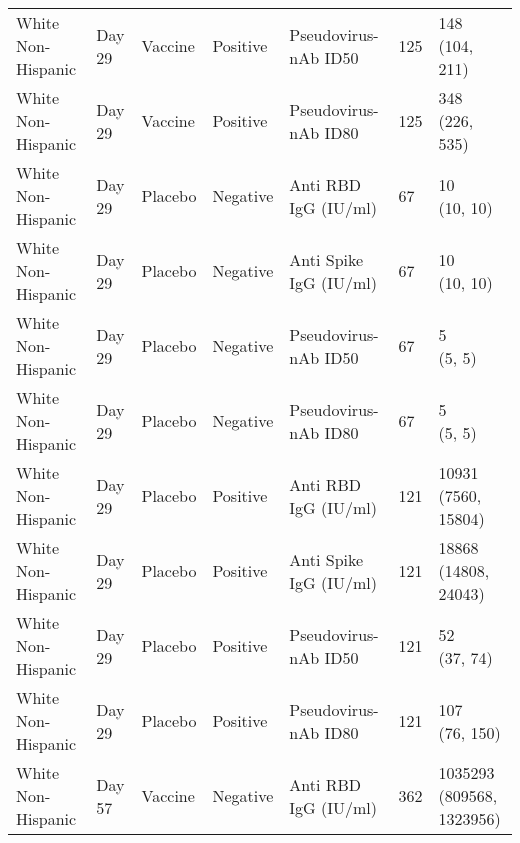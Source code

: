 \documentclass[]{book}
\theoremstyle{definition}
\theoremstyle{definition}
\theoremstyle{definition}
\newcommand{\1}{\mathbbm{1}}
\begin{document}
\begin{landscape}
\begin{ThreePartTable}
\begin{longtable}[t]{>{\raggedright\arraybackslash}p{7cm}llllll}
\hspace{1em}White Non-Hispanic & Day 29 & Vaccine & Positive & Pseudovirus-nAb ID50 & 125 & \makecell[l]{148\\(104, 211)}\\
\hspace{1em}White Non-Hispanic & Day 29 & Vaccine & Positive & Pseudovirus-nAb ID80 & 125 & \makecell[l]{348\\(226, 535)}\\
\hspace{1em}White Non-Hispanic & Day 29 & Placebo & Negative & Anti RBD IgG (IU/ml) & 67 & \makecell[l]{10\\(10, 10)}\\
\hspace{1em}White Non-Hispanic & Day 29 & Placebo & Negative & Anti Spike IgG (IU/ml) & 67 & \makecell[l]{10\\(10, 10)}\\
\hspace{1em}White Non-Hispanic & Day 29 & Placebo & Negative & Pseudovirus-nAb ID50 & 67 & \makecell[l]{5\\(5, 5)}\\
\hspace{1em}White Non-Hispanic & Day 29 & Placebo & Negative & Pseudovirus-nAb ID80 & 67 & \makecell[l]{5\\(5, 5)}\\
\hspace{1em}White Non-Hispanic & Day 29 & Placebo & Positive & Anti RBD IgG (IU/ml) & 121 & \makecell[l]{10931\\(7560, 15804)}\\
\hspace{1em}White Non-Hispanic & Day 29 & Placebo & Positive & Anti Spike IgG (IU/ml) & 121 & \makecell[l]{18868\\(14808, 24043)}\\
\hspace{1em}White Non-Hispanic & Day 29 & Placebo & Positive & Pseudovirus-nAb ID50 & 121 & \makecell[l]{52\\(37, 74)}\\
\hspace{1em}White Non-Hispanic & Day 29 & Placebo & Positive & Pseudovirus-nAb ID80 & 121 & \makecell[l]{107\\(76, 150)}\\
\hspace{1em}White Non-Hispanic & Day 57 & Vaccine & Negative & Anti RBD IgG (IU/ml) & 362 & \makecell[l]{1035293\\(809568, 1323956)}\\

\end{longtable}
\end{ThreePartTable}
\end{landscape}
\end{document}
